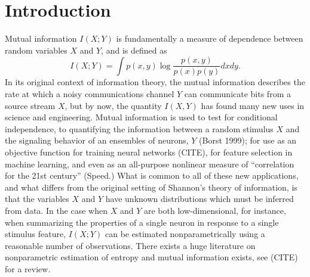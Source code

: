 \documentclass{article}
\begin{document}
\section{Introduction}

Mutual information $I(X; Y)$ is fundamentally a measure of dependence
between random variables $X$ and $Y$, and is defined as
\[
I(X;Y) = \int p(x, y) \log \frac{p(x, y)}{p(x)p(y)}dxdy.
\]
In its original context of information theory, the mutual
information describes the rate at which a noisy communications channel $Y$ can communicate bits from
a source stream $X$, but by now, the quantity $I(X, Y)$ has found many new uses
in science and engineering.  Mutual information is used to test for conditional independence, to quantifying the information between a random stimulus $X$ and the signaling behavior of an ensembles of neurons, $Y$ (Borst 1999); for use as an objective function for training neural networks (CITE), for feature selection in machine learning, and even as an all-purpose nonlinear measure of ``correlation for the 21st century'' (Speed.)  What is common to all of these new applications, and what differs from the original setting of Shannon's theory of information, is that the variables $X$ and $Y$ have unknown distributions which must be inferred from data.  In the case when $X$ and $Y$ are both low-dimensional,
for instance, when summarizing the properties of a single neuron in response to a single stimulus feature, $I(X; Y)$ can be estimated nonparametrically using a reasonable number of observations.
There exists a huge literature on nonparametric estimation of entropy and mutual information exists, see (CITE) for a review.
\end{document}
